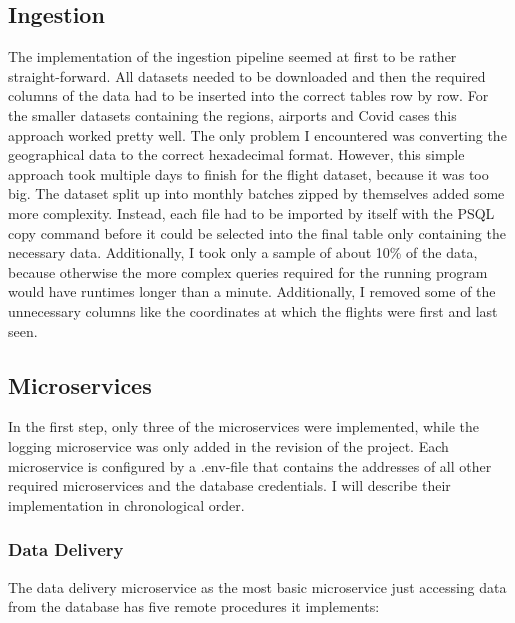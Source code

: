 \documentclass[11pt]{article}
\begin{document}
	\subsection{Ingestion}
	
	The implementation of the ingestion pipeline seemed at first to be rather straight-forward. All datasets needed to be downloaded and then the required columns of the data had to be inserted into the correct tables row by row. For the smaller datasets containing the regions, airports and Covid cases this approach worked pretty well. The only problem I encountered was converting the geographical data to the correct hexadecimal format. However, this simple approach took multiple days to finish for the flight dataset, because it was too big. The dataset split up into monthly batches zipped by themselves added some more complexity. Instead, each file had to be imported by itself with the PSQL copy command before it could be selected into the final table only containing the necessary data. Additionally, I took only a sample of about 10\% of the data, because otherwise the more complex queries required for the running program would have runtimes longer than a minute. Additionally, I removed some of the unnecessary columns like the coordinates at which the flights were first and last seen.
	
	\subsection{Microservices}
	
	In the first step, only three of the microservices were implemented, while the logging microservice was only added in the revision of the project. Each microservice is configured by a .env-file that contains the addresses of all other required microservices and the database credentials. I will describe their implementation in chronological order.
	
	\subsubsection{Data Delivery}
	
	The data delivery microservice as the most basic microservice just accessing data from the database has five remote procedures it implements: 
	
\end{document}
